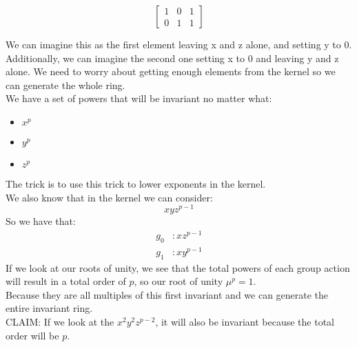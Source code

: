 \documentclass[10pt,oneside]{article}
\newcommand{\vpp}{\vspace{0.25cm}\\}
\begin{document}
$$
\begin{bmatrix}
    1 & 0 & 1\\
    0 & 1 & 1
\end{bmatrix}
$$

We can imagine this as the first element leaving x and z alone, and setting y to 0. Additionally, we can imagine the second one setting x to 0 and leaving y and z alone. We need to worry about getting enough elements from the kernel so we can generate the whole ring.\vpp
We have a set of powers that will be invariant no matter what:
\begin{itemize}
    \item $x^p$
    \item $y^p$
    \item $z^p$
\end{itemize}
The trick is to use this trick to lower exponents in the kernel. \\
We also know that in the kernel we can consider:
$$xyz^{p-1}$$
So we have that:
\begin{align*}
    g_0&: xz^{p-1}\\
    g_1&: xy^{p-1}
\end{align*}
If we look at our roots of unity, we see that the total powers of each group action will result in a total order of $p$, so our root of unity $\mu^p = 1$. \vpp
Because they are all multiples of this first invariant and we can generate the entire invariant ring. \vpp
CLAIM: If we look at the $x^2y^2z^{p-2}$, it will also be invariant because the total order will be $p$. 
\end{document}
